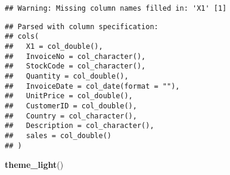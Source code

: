\documentclass[]{article}
\newenvironment{Shaded}{\begin{snugshade}}{\end{snugshade}}
\newcommand{\KeywordTok}[1]{\textcolor[rgb]{0.13,0.29,0.53}{\textbf{#1}}}
\newcommand{\NormalTok}[1]{#1}
\begin{document}
\begin{verbatim}
## Warning: Missing column names filled in: 'X1' [1]
\end{verbatim}

\begin{verbatim}
## Parsed with column specification:
## cols(
##   X1 = col_double(),
##   InvoiceNo = col_character(),
##   StockCode = col_character(),
##   Quantity = col_double(),
##   InvoiceDate = col_date(format = ""),
##   UnitPrice = col_double(),
##   CustomerID = col_double(),
##   Country = col_character(),
##   Description = col_character(),
##   sales = col_double()
## )
\end{verbatim}

\begin{Shaded}
\begin{Highlighting}[]
\KeywordTok{theme_light}\NormalTok{()}
\end{Highlighting}
\end{Shaded}
\end{document}
